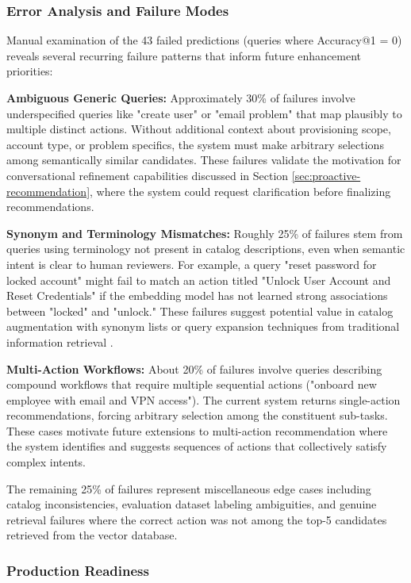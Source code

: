\subsubsection{Error Analysis and Failure Modes}

Manual examination of the 43 failed predictions (queries where Accuracy@1 = 0) reveals several recurring failure patterns that inform future enhancement priorities:

\textbf{Ambiguous Generic Queries:} Approximately 30\% of failures involve underspecified queries like "create user" or "email problem" that map plausibly to multiple distinct actions. Without additional context about provisioning scope, account type, or problem specifics, the system must make arbitrary selections among semantically similar candidates. These failures validate the motivation for conversational refinement capabilities discussed in Section \ref{sec:proactive-recommendation}, where the system could request clarification before finalizing recommendations.

\textbf{Synonym and Terminology Mismatches:} Roughly 25\% of failures stem from queries using terminology not present in catalog descriptions, even when semantic intent is clear to human reviewers. For example, a query "reset password for locked account" might fail to match an action titled "Unlock User Account and Reset Credentials" if the embedding model has not learned strong associations between "locked" and "unlock." These failures suggest potential value in catalog augmentation with synonym lists or query expansion techniques from traditional information retrieval \cite{manning2008introduction}.

\textbf{Multi-Action Workflows:} About 20\% of failures involve queries describing compound workflows that require multiple sequential actions ("onboard new employee with email and VPN access"). The current system returns single-action recommendations, forcing arbitrary selection among the constituent sub-tasks. These cases motivate future extensions to multi-action recommendation where the system identifies and suggests sequences of actions that collectively satisfy complex intents.

The remaining 25\% of failures represent miscellaneous edge cases including catalog inconsistencies, evaluation dataset labeling ambiguities, and genuine retrieval failures where the correct action was not among the top-5 candidates retrieved from the vector database.

\subsubsection{Production Readiness}

